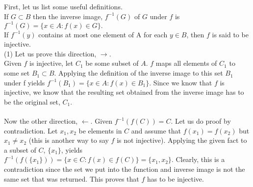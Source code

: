 \documentclass[12pt,letterpaper,boxed]{hmcpset}
\begin{document}
\begin{solution}
First, let us list some useful definitions.\\
If $G \subset B$ then the inverse image, $f^{-1}(G)$ of $G$ under $f$ is $f^{-1}(G)=\{x \in A : f(x) \in G\}.$
\\ If $f^{-1}(y)$ contains at most one element of A for each $y \in B$, then $f$ is said to be injective. 
\\ \newline
(1) Let us prove this direction, $\rightarrow$. \\
Given $f$ is injective, let $C_1$ be some subset of $A$. $f$ maps all elements of $C_1$ to some set $B_1 \subset B$. Applying the definition of the inverse image to this set $B_1$ under f yields $f^{-1}(B_1)=\{x \in A:f(x)\in B_1\}.$ Since we know that $f$ is injective, we know that the resulting set obtained from the inverse image has to be the original set, $C_1$. \\ \\
Now the other direction, $\leftarrow$. Given $f^{-1}(f(C))=C$. Let us do proof by contradiction. Let $x_1, x_2$ be elements in $C$ and assume that $f(x_1)=f(x_2)$ but $x_1 \neq x_2$ (this is another way to say $f$ is not injective). Applying the given fact to a subset of $C$, $\{x_1\}$, yields $f^{-1}(f(\{x_1\}))=\{x \in C:f(x)\in f(C)\} = \{x_1, x_2\}$. Clearly, this is a contradiction since the set we put into the function and inverse image is not the same set that was returned. This proves that $f$ has to be injective.
\newline


\end{solution}
\end{document}
